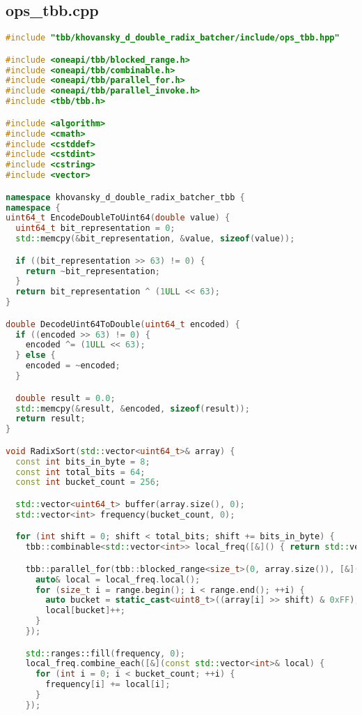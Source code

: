 \documentclass[12pt]{article}
\begin{document}
\subsection*{ops\_tbb.cpp}
\begin{lstlisting}[language=C++,
    breaklines=true,       % Автоматический перенос строк
    columns=fullflexible ]
#include "tbb/khovansky_d_double_radix_batcher/include/ops_tbb.hpp"

#include <oneapi/tbb/blocked_range.h>
#include <oneapi/tbb/combinable.h>
#include <oneapi/tbb/parallel_for.h>
#include <oneapi/tbb/parallel_invoke.h>
#include <tbb/tbb.h>

#include <algorithm>
#include <cmath>
#include <cstddef>
#include <cstdint>
#include <cstring>
#include <vector>

namespace khovansky_d_double_radix_batcher_tbb {
namespace {
uint64_t EncodeDoubleToUint64(double value) {
  uint64_t bit_representation = 0;
  std::memcpy(&bit_representation, &value, sizeof(value));

  if ((bit_representation >> 63) != 0) {
    return ~bit_representation;
  }
  return bit_representation ^ (1ULL << 63);
}

double DecodeUint64ToDouble(uint64_t encoded) {
  if ((encoded >> 63) != 0) {
    encoded ^= (1ULL << 63);
  } else {
    encoded = ~encoded;
  }

  double result = 0.0;
  std::memcpy(&result, &encoded, sizeof(result));
  return result;
}

void RadixSort(std::vector<uint64_t>& array) {
  const int bits_in_byte = 8;
  const int total_bits = 64;
  const int bucket_count = 256;

  std::vector<uint64_t> buffer(array.size(), 0);
  std::vector<int> frequency(bucket_count, 0);

  for (int shift = 0; shift < total_bits; shift += bits_in_byte) {
    tbb::combinable<std::vector<int>> local_freq([&]() { return std::vector<int>(bucket_count, 0); });

    tbb::parallel_for(tbb::blocked_range<size_t>(0, array.size()), [&](const tbb::blocked_range<size_t>& range) {
      auto& local = local_freq.local();
      for (size_t i = range.begin(); i < range.end(); ++i) {
        auto bucket = static_cast<uint8_t>((array[i] >> shift) & 0xFF);
        local[bucket]++;
      }
    });

    std::ranges::fill(frequency, 0);
    local_freq.combine_each([&](const std::vector<int>& local) {
      for (int i = 0; i < bucket_count; ++i) {
        frequency[i] += local[i];
      }
    });


\end{lstlisting}
\end{document}
